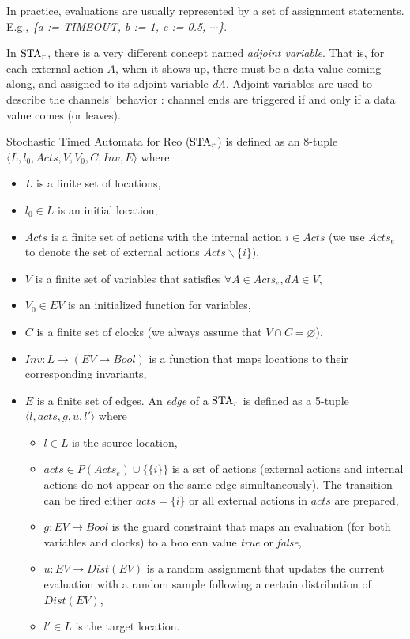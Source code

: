 In practice, evaluations are usually represented by a set of assignment statements. E.g., \emph{\{a := TIMEOUT, b := 1, c := 0.5, $\cdots$\}}.

In $\nSTA$, there is a very different concept named \emph{adjoint variable}. That is, for each external action $A$, when it shows up, there must be a data value coming along, and assigned to its adjoint variable \emph{dA}. Adjoint variables are used to describe the channels' behavior : channel ends are triggered if and only if a data value comes (or leaves).

\begin{definition}[$\nSTA$]
Stochastic Timed Automata for Reo ($\nSTA$) is defined as an 8-tuple $\langle L, l_0, Acts, V, V_0, C, Inv, E\rangle$ where:

\begin{itemize}
    \item $L$ is a finite set of locations,
    \item $l_0\in L$ is an initial location,
    \item $Acts$ is a finite set of actions with the internal action $i\in Acts$ (we use $Acts_e$ to denote the set of external actions $Acts\backslash \{i\}$),
    \item $V$ is a finite set of variables that satisfies $\forall A\in Acts_e, dA\in V$,
    \item $V_0\in EV$ is an initialized function for variables,
    \item $C$ is a finite set of clocks (we always assume that $V\cap C=\varnothing$),
    \item $Inv:L\rightarrow (EV\rightarrow Bool)$ is a function that maps locations to their corresponding invariants,
    \item $E$ is a finite set of edges. An \emph{edge} of a $\nSTA$ is defined as a 5-tuple $\langle l, acts, g, u, l'\rangle$ where
        \begin{itemize}
            \item $l\in L$ is the source location,
            \item $acts\in P(Acts_e)\cup\{\{i\}\}$ is a set of actions (external actions and internal actions do not appear on the same edge simultaneously). The transition can be fired either $acts=\{i\}$ or all external actions in $acts$ are prepared,
            \item $g:EV\rightarrow Bool$ is the guard constraint that maps an evaluation (for both variables and clocks) to a boolean value \emph{true} or \emph{false},
            \item $u:EV\rightarrow Dist(EV)$ is a random assignment that updates the current evaluation with a random sample following a certain distribution of $Dist(EV)$,
            \item $l'\in L$ is the target location.
        \end{itemize}
\end{itemize}
\end{definition}

